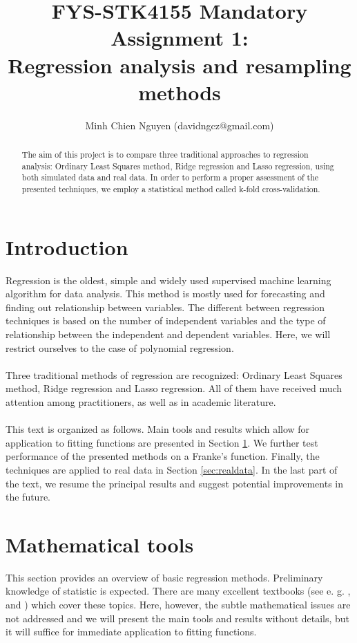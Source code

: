 \documentclass [11pt]{article}
\title{FYS-STK4155 Mandatory Assignment 1: \\ Regression analysis and resampling methods}
\author{Minh Chien Nguyen (davidngcz@gmail.com)}
\begin{document}
\maketitle
\nocite{*}
\begin{abstract}
The aim of this project is to compare three traditional approaches to regression analysis: Ordinary Least Squares method, Ridge regression and Lasso regression, using both simulated data and real data. In order to perform a proper assessment of the presented techniques, we employ a statistical method called k-fold cross-validation.
\end{abstract}

\section*{Introduction}
Regression is the oldest, simple and widely used supervised machine learning algorithm for data analysis. This method is mostly used for forecasting and finding out relationship between variables. The different between regression techniques is based on the number of independent variables and the type of relationship between the independent and dependent variables. Here, we will restrict ourselves to the case of polynomial regression.\\
\\
Three traditional methods of regression are recognized: Ordinary Least Squares method, Ridge regression and Lasso regression. All of them have received much attention among practitioners, as well as in academic literature.\\
\\
This text is organized as follows. Main tools and results which allow for application to fitting functions are presented in Section \ref{sec:techniques}. We further test performance of the presented methods on a Franke's
function. Finally, the techniques are applied to real data in Section \ref{sec:realdata}. In the last part of the text, we resume the principal results and suggest potential improvements in the future.
\section{Mathematical tools}
\label{sec:techniques}
This section provides an overview of basic regression methods. Preliminary knowledge of statistic is expected. There are many excellent textbooks (see e. g. \cite{abc},\cite{TRJ} and \cite{def}) which cover these topics. Here, however, the subtle mathematical issues are not addressed and we will present the main tools and results without details, but it will suffice for immediate application to fitting functions.\\
\end{document}

